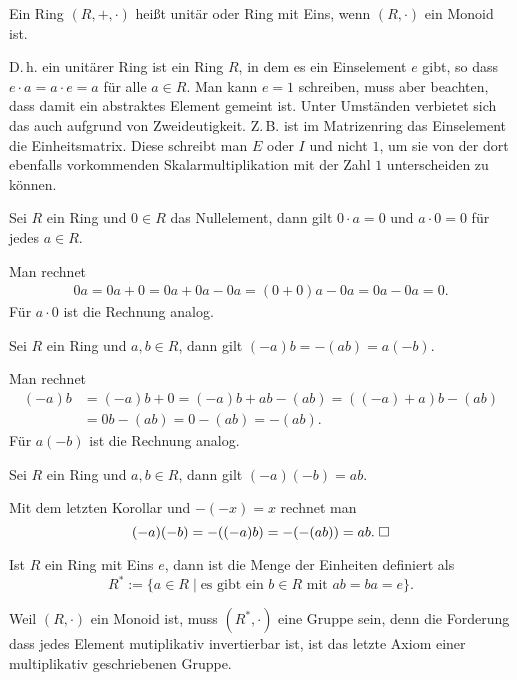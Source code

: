 \begin{Definition}\newlinefirst
Ein Ring $(R,+,\cdot)$ heißt unitär oder Ring mit Eins, wenn
$(R,\cdot)$ ein Monoid ist.
\end{Definition}
D.\,h. ein unitärer Ring ist ein Ring $R$, in dem es ein Einselement
$e$ gibt, so dass $e\cdot a=a\cdot e=a$ für alle $a\in R$. Man kann
$e=1$ schreiben, muss aber beachten, dass damit ein abstraktes Element
gemeint ist. Unter Umständen verbietet sich das auch aufgrund von
Zweideutigkeit. Z.\,B. ist im Matrizenring das Einselement die
Einheitsmatrix. Diese schreibt man $E$ oder $I$ und nicht $1$, um sie
von der dort ebenfalls vorkommenden Skalarmultiplikation mit der
Zahl $1$ unterscheiden zu können.

\begin{Korollar}
Sei $R$ ein Ring und $0\in R$ das Nullelement, dann gilt
$0\cdot a = 0$ und $a\cdot 0 = 0$ für jedes $a\in R$.
\end{Korollar}
 Man rechnet
\begin{align*}
0a = 0a+0 = 0a+0a-0a = (0+0)a-0a = 0a-0a = 0.
\end{align*}
Für $a\cdot 0$ ist die Rechnung analog.\;\qedsymbol

\begin{Korollar}
Sei $R$ ein Ring und $a,b\in R$, dann gilt $(-a)b = -(ab) = a(-b)$.
\end{Korollar}
 Man rechnet
\begin{align*}
(-a)b &= (-a)b+0 = (-a)b+ab-(ab) = ((-a)+a)b-(ab)\\
&= 0b-(ab) = 0-(ab) = -(ab).
\end{align*}
Für $a(-b)$ ist die Rechnung analog.\;\qedsymbol
\begin{Korollar}
Sei $R$ ein Ring und $a,b\in R$, dann gilt $(-a)(-b)=ab$.
\end{Korollar}
 Mit dem letzten Korollar und $-(-x)=x$ rechnet man
\[(-a)(-b) = -((-a)b) = -(-(ab)) = ab.\;\Box\]

\begin{Definition}[Einheitengruppe]\newlinefirst
Ist $R$ ein Ring mit Eins $e$, dann ist die Menge der Einheiten definiert als
\[R^* := \{a\in R\mid \text{es gibt ein $b\in R$ mit $ab=ba=e$}\}.\]
\end{Definition}
Weil $(R,\cdot)$ ein Monoid ist, muss $(R^*,\cdot)$ eine Gruppe sein,
denn die Forderung dass jedes Element mutiplikativ invertierbar ist,
ist das letzte Axiom einer multiplikativ geschriebenen Gruppe.

